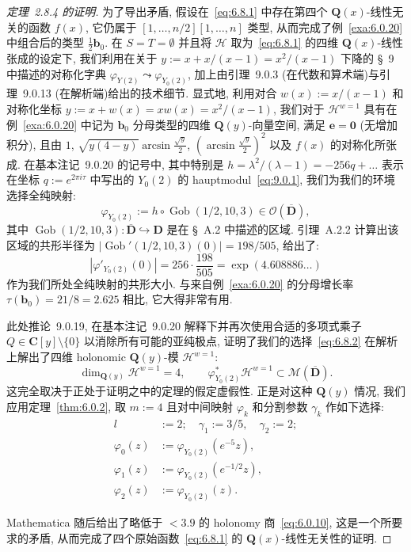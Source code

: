 \begin{proof}[定理~2.8.4 的证明]
为了导出矛盾, 假设在~\eqref{eq:6.8.1} 中存在第四个 $\mathbf{Q}(x)$-线性无关的函数 $f(x)$, 它仍属于 $[1,\ldots,n/2][1,\ldots,n]$ 类型, 从而完成了例~\ref{exa:6.0.20} 中组合后的类型 $\frac{1}{2}\mathbf{b}_0$.
在 $S=T=\emptyset$ 并且将 $\mathcal{H}$ 取为~\eqref{eq:6.8.1} 的四维 $\mathbf{Q}(x)$-线性张成的设定下, 我们利用在关于 $y:=x+x/(x-1)=x^2/(x-1)$ 下降的 \S~9 中描述的对称化字典 $\varphi_{Y(2)} \leadsto \varphi_{Y_0(2)}$, 加上由引理~9.0.3 (在代数和算术端)与引理~9.0.13 (在解析端)给出的技术细节.
显式地, 利用对合 $w(x):=x/(x-1)$ 和对称化坐标 $y:=x+w(x)=xw(x)=x^2/(x-1)$, 我们对于 $\mathcal{H}^{w=1}$ 具有在例~\ref{exa:6.0.20} 中记为 $\mathbf{b}_0$ 分母类型的四维 $\mathbf{Q}(y)$-向量空间, 满足 $\mathbf{e}=\mathbf{0}$ (无增加积分), 且由 $1$, $\sqrt{y(4-y)}\arcsin \frac{\sqrt{y}}{2}$, $\left(\arcsin\frac{\sqrt{y}}{2}\right)^2$ 以及 $f(x)$ 的对称化所张成.
在基本注记~9.0.20 的记号中, 其中特别是 $h=\lambda^2/(\lambda-1)=-256q+\dots$ 表示在坐标 $q:=e^{2\pi i \tau}$ 中写出的 $Y_0(2)$ 的 hauptmodul~\eqref{eq:9.0.1}, 我们为我们的环境选择全纯映射:
\begin{equation}\label{eq:6.8.2}
\varphi_{Y_0(2)} := h \circ \operatorname{Gob}(1/2, 10, 3) \in \mathcal{O}(\overline{\mathbf{D}}),
\end{equation}
其中 $\operatorname{Gob}(1/2, 10, 3) : \overline{\mathbf{D}} \hookrightarrow \mathbf{D}$ 是在 \S~A.2 中描述的区域.
引理~A.2.2 计算出该区域的共形半径为 $|\operatorname{Gob}'(1/2, 10, 3)(0)| = 198/505$, 给出了:
\begin{equation}\label{eq:6.8.3}
|\varphi'_{Y_0(2)}(0)| = 256 \cdot \frac{198}{505} = \exp(4.608886\dots)
\end{equation}
作为我们所处全纯映射的共形大小.
与来自例~\ref{exa:6.0.20} 的分母增长率 $\tau(\mathbf{b}_0) = 21/8 = 2.625$ 相比, 它大得非常有用.

此处推论~9.0.19, 在基本注记~9.0.20 解释下并再次使用合适的多项式乘子 $Q \in \mathbf{C}[y] \setminus \{0\}$ 以消除所有可能的亚纯极点, 证明了我们的选择~\eqref{eq:6.8.2} 在解析上解出了四维 holonomic $\mathbf{Q}(y)$-模 $\mathcal{H}^{w=1}$:
\begin{equation}\label{eq:6.8.4}
\dim_{\mathbf{Q}(y)} \mathcal{H}^{w=1} = 4, \qquad \varphi_{Y_0(2)}^* \mathcal{H}^{w=1} \subset \mathcal{M}(\overline{\mathbf{D}}).
\end{equation}
这完全取决于正处于证明之中的定理的假定虚假性.
正是对这种 $\mathbf{Q}(y)$ 情况, 我们应用定理~\ref{thm:6.0.2}, 取 $m := 4$ 且对中间映射 $\varphi_k$ 和分割参数 $\gamma_k$ 作如下选择:
\begin{align}
l &:= 2; \quad \gamma_1 := 3/5, \quad \gamma_2 := 2; \nonumber\\
\varphi_0(z) &:= \varphi_{Y_0(2)} (e^{-5} z), \nonumber\\
\varphi_1(z) &:= \varphi_{Y_0(2)} (e^{-1/2} z), \nonumber\\
\varphi_2(z) &:= \varphi_{Y_0(2)}(z).\label{eq:6.8.5}
\end{align}

Mathematica 随后给出了略低于 $< 3.9$ 的 holonomy 商~\eqref{eq:6.0.10}, 这是一个所要求的矛盾, 从而完成了四个原始函数~\eqref{eq:6.8.1} 的 $\mathbf{Q}(x)$-线性无关性的证明.
\end{proof}

